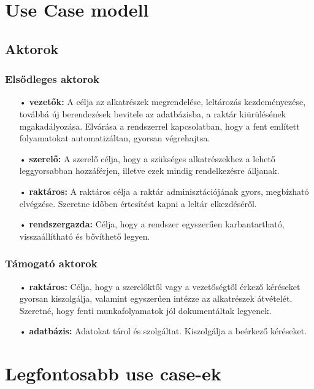 \documentclass[12pt]{article}\usepackage[left=20mm,right=20mm,top=15mm,bottom=20mm]{geometry}
\begin{document}
\section{Use Case modell}
\subsection{Aktorok}
\subsubsection{Elsődleges aktorok}
\begin{itemize}
\item[•] \textbf{vezetők: }  A célja az alkatrészek megrendelése, leltározás kezdeményezése, továbbá új berendezések bevitele az adatbázisba, a raktár kiürülésének mgakadályozása. Elvárása a rendszerrel kapcsolatban, hogy a fent említett folyamatokat automatizáltan, gyorsan végrehajtsa.
 
\item[•] \textbf{szerelő: } A szerelő célja, hogy a szükséges alkatrészekhez a lehető leggyorsabban hozzáférjen, illetve ezek mindig rendelkezésre álljanak.

\item[•] \textbf{raktáros: } A raktáros célja a raktár adminisztációjának gyors, megbízható elvégzése. 
Szeretne időben értesítést kapni a leltár elkezdéséről.

\item[•] \textbf{rendszergazda: } Célja, hogy a rendszer egyszerűen karbantartható, visszaállítható és bővíthető legyen.
\end{itemize}

\subsubsection{Támogató aktorok}
\begin{itemize}
\item[•] \textbf{raktáros: } Célja, hogy a szerelőktől vagy a vezetőségtől érkező kéréseket gyorsan kiszolgálja, valamint egyszerűen intézze az alkatrészek átvételét.
Szeretné, hogy fenti munkafolyamatok jól dokumentáltak legyenek.

\item[•] \textbf{adatbázis: } Adatokat tárol és szolgáltat. Kiszolgálja a beérkező kéréseket.
\end{itemize}

\section{Legfontosabb use case-ek}
\end{document}
